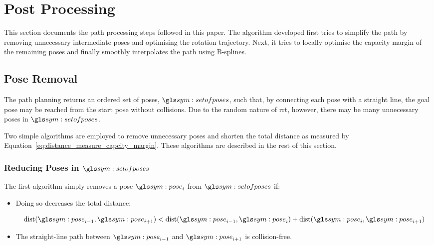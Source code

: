 \section{Post Processing}

	This section documents the path processing steps followed in this paper. The
	algorithm developed first tries to simplify the path by removing unnecessary
	intermediate poses and optimising the rotation trajectory. Next, it tries to
	locally optimise the capacity margin of the remaining poses and finally
	smoothly interpolates the path using B-splines.

	\subsection{Pose Removal}

		The path planning returns an ordered set of poses, $\setofposes$, such
		that, by connecting each pose with a straight line, the goal pose may be
		reached from the start pose without collisions. Due to the random nature
		of \gls{rrt}, however, there may be many unnecessary poses in
		$\setofposes$.

		Two simple algorithms are employed to remove unnecessary poses and
		shorten the total distance as measured by
		Equation~\ref{eq:distance_measure_capcity_margin}. These algorithms are
		described in the rest of this section.

		\subsubsection{Reducing Poses in $\setofposes$}

			The first algorithm simply removes a pose $\pose_i$ from
			$\setofposes$ if:

			\begin{itemize}

				\item

					Doing so decreases the total distance:

					\begin{equation}
						\dist(\pose_{i - 1}, \pose_{i + 1}) <
							\dist(\pose_{i - 1}, \pose_i)
							+ \dist(\pose_i, \pose_{i + 1})
					\end{equation}

				\item

					The straight-line path between $\pose_{i - 1}$ and $\pose_{i
					+ 1}$ is collision-free.

			\end{itemize}

